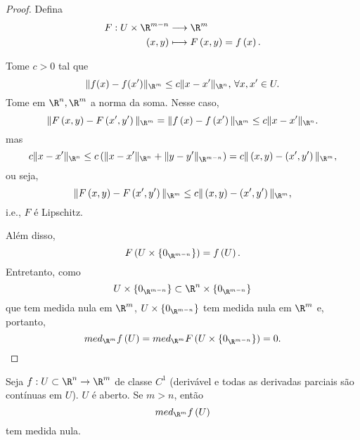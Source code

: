 \begin{proof}
    Defina 
    \begin{align*}
        F: U\times \R^{m-n} &\longrightarrow \R^{m} \\
        \left( x,y \right)  &\longmapsto F\left( x,y \right) = f\left( x \right) 
    .\end{align*}

    Tome $c> 0$ tal que \[
	\|f(x) - f(x')\|_{\R^{m}}\le c \|x-x'\|_{\R^{n}} \text{, }\forall x,x' \in U
    .\] Tome em $\R^{n},\R^{m}$ a norma da soma. Nesse caso, \[
    \|F\left( x,y \right) - F\left( x',y' \right) \|_{\R^{m}} = \|f\left( x \right) - f\left( x' \right) \|_{\R^{m}} \le c\|x-x'\|_{\R^{n}}
    .\] mas \[
    c\|x-x'\|_{\R^{n}} \le c\left( \|x-x'\|_{\R^{n}}+\|y-y'\|_{\R^{m-n}} \right) = c\|\left( x,y \right) -\left( x',y' \right) \|_{\R^{m}}
    ,\] ou seja, \[
    \|F\left( x,y \right) - F\left( x',y' \right) \|_{\R^{m}} \le c\|\left( x,y \right) -\left( x',y' \right) \|_{\R^{m}}
    ,\] i.e., $F$ é Lipschitz.

    Além disso, \[
    F\left( U\times \left\{ 0_{\R^{m-n}} \right\}  \right) = f\left( U \right) 
    .\] Entretanto, como \[
    U\times \left\{ 0_{\R^{m-n}} \right\} \subset \R^{n}\times \left\{ 0_{\R^{m-n}} \right\}
    \] que tem medida nula em $\R^{m}$, $U\times \left\{ 0_{\R^{m-n}} \right\}$ tem medida nula em $\R^{m}$ e, portanto, \[
     med_{\R^{m}}f\left( U \right)  = med_{\R^{m}}F\left( U\times \left\{ 0_{\R^{m-n}} \right\} \right) = 0
    .\] 
\end{proof}

\begin{theorem}
    Seja $f:U\subset \R^{n}\to \R^{m}$ de classe $C^{1}$ (derivável e todas as derivadas parciais são contínuas em $U$). $U$ é aberto. Se $m>n$, então \[
    med_{\R^{m}} f\left( U \right) 
    \] tem medida nula.
\end{theorem}

